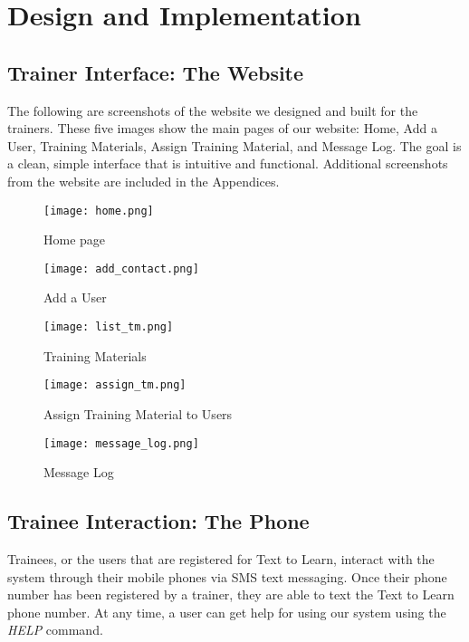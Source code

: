 \chapter{Design and Implementation}

\section{Trainer Interface: The Website}
The following are screenshots of the website we designed and built for the trainers. These five images show the main pages of our website: Home, Add a User, Training Materials, Assign Training Material, and Message Log. The goal is a clean, simple interface that is intuitive and functional. Additional screenshots from the website are included in the Appendices.

\begin{figure}[H]
	\centering
	\texttt{[image: home.png]}
	\caption{Home page}
\end{figure}

\begin{figure}[H]
	\centering
	\texttt{[image: add\_contact.png]}
	\caption{Add a User}
\end{figure}

\begin{figure}[H]
	\centering
	\texttt{[image: list\_tm.png]}
	\caption{Training Materials}
\end{figure}

\begin{figure}[H]
	\centering
	\texttt{[image: assign\_tm.png]}
	\caption{Assign Training Material to Users}
\end{figure}

\begin{figure}[H]
	\centering
	\texttt{[image: message\_log.png]}
	\caption{Message Log}
\end{figure}


\section{Trainee Interaction: The Phone}
Trainees, or the users that are registered for Text to Learn, interact with the system through their mobile phones via SMS text messaging. Once their phone number has been registered by a trainer, they are able to text the Text to Learn phone number. At any time, a user can get help for using our system using the \textit{HELP} command.



